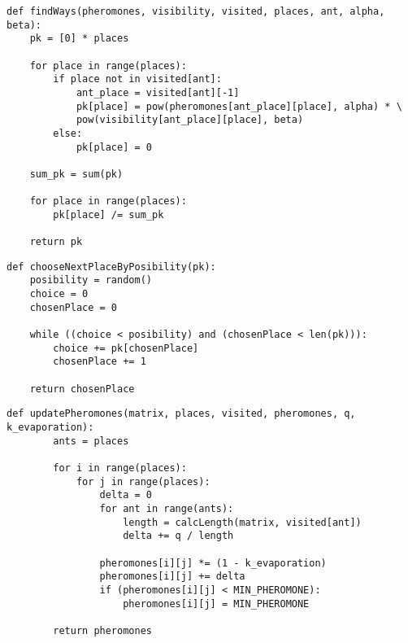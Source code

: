 \clearpage


\begin{center}
	\captionsetup{justification=raggedright,singlelinecheck=off}
	\begin{lstlisting}[label=lst:prob_arr,caption=Алгоритм нахождения массива вероятностных переходов в непосещенные города]
def findWays(pheromones, visibility, visited, places, ant, alpha, beta):
	pk = [0] * places
	
	for place in range(places):
		if place not in visited[ant]:
			ant_place = visited[ant][-1]
			pk[place] = pow(pheromones[ant_place][place], alpha) * \
			pow(visibility[ant_place][place], beta)
		else:
			pk[place] = 0
	
	sum_pk = sum(pk)
	
	for place in range(places):
		pk[place] /= sum_pk
	
	return pk
	\end{lstlisting}
\end{center}

\clearpage

\begin{center}
	\captionsetup{justification=raggedright,singlelinecheck=off}
	\begin{lstlisting}[label=lst:choose_next,caption=Алгоритм нахождения следующего города на основании рандома]
def chooseNextPlaceByPosibility(pk):
	posibility = random()
	choice = 0
	chosenPlace = 0
	
	while ((choice < posibility) and (chosenPlace < len(pk))):
		choice += pk[chosenPlace]
		chosenPlace += 1
	
	return chosenPlace
	\end{lstlisting}
\end{center}


\begin{center}
	\captionsetup{justification=raggedright,singlelinecheck=off}
	\begin{lstlisting}[label=lst:upd_pher,caption=Алгоритм обновления матрицы феромонов]
	def updatePheromones(matrix, places, visited, pheromones, q, k_evaporation):
		ants = places
		
		for i in range(places):
			for j in range(places):
				delta = 0
				for ant in range(ants):
					length = calcLength(matrix, visited[ant])
					delta += q / length
				
				pheromones[i][j] *= (1 - k_evaporation)
				pheromones[i][j] += delta
				if (pheromones[i][j] < MIN_PHEROMONE):
					pheromones[i][j] = MIN_PHEROMONE
		
		return pheromones
	\end{lstlisting}
\end{center}


